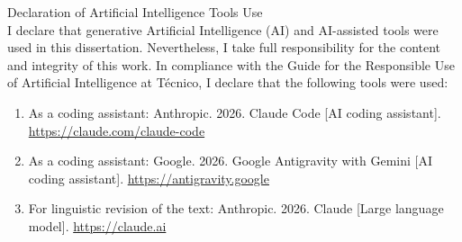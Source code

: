 
\null\vskip5cm%
\begin{flushleft}
	Declaration of Artificial Intelligence Tools Use \\
	I declare that generative Artificial Intelligence (AI) and AI-assisted tools were used in this dissertation. Nevertheless, I take full responsibility for the content and integrity of this work. In compliance with the Guide for the Responsible Use of Artificial Intelligence at T\'{e}cnico, I declare that the following tools were used:
	\begin{enumerate}
		\item As a coding assistant: Anthropic. 2026. Claude Code [AI coding assistant]. \url{https://claude.com/claude-code}
		\item As a coding assistant: Google. 2026. Google Antigravity with Gemini [AI coding assistant]. \url{https://antigravity.google}
		\item For linguistic revision of the text: Anthropic. 2026. Claude [Large language model]. \url{https://claude.ai}
	\end{enumerate}
\end{flushleft}
\vfill\newpage
